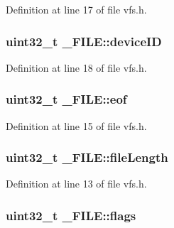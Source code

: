 Definition at line 17 of file vfs.\+h.

\subsubsection[{\texorpdfstring{device\+ID}{deviceID}}]{\setlength{\rightskip}{0pt plus 5cm}uint32\+\_\+t \+\_\+\+F\+I\+L\+E\+::device\+ID}\hypertarget{struct__FILE_a81958585561000f4b18409bf81c06755}{}\label{struct__FILE_a81958585561000f4b18409bf81c06755}


Definition at line 18 of file vfs.\+h.

\subsubsection[{\texorpdfstring{eof}{eof}}]{\setlength{\rightskip}{0pt plus 5cm}uint32\+\_\+t \+\_\+\+F\+I\+L\+E\+::eof}\hypertarget{struct__FILE_a9fece9dca128f88e081a2f9d879b5a70}{}\label{struct__FILE_a9fece9dca128f88e081a2f9d879b5a70}


Definition at line 15 of file vfs.\+h.

\subsubsection[{\texorpdfstring{file\+Length}{fileLength}}]{\setlength{\rightskip}{0pt plus 5cm}uint32\+\_\+t \+\_\+\+F\+I\+L\+E\+::file\+Length}\hypertarget{struct__FILE_a3bc033e1420b222573c83e7305c0a8e1}{}\label{struct__FILE_a3bc033e1420b222573c83e7305c0a8e1}


Definition at line 13 of file vfs.\+h.

\subsubsection[{\texorpdfstring{flags}{flags}}]{\setlength{\rightskip}{0pt plus 5cm}uint32\+\_\+t \+\_\+\+F\+I\+L\+E\+::flags}\hypertarget{struct__FILE_a04f8186df85989c0b4bcdb010c1f5bb6}{}\label{struct__FILE_a04f8186df85989c0b4bcdb010c1f5bb6}


